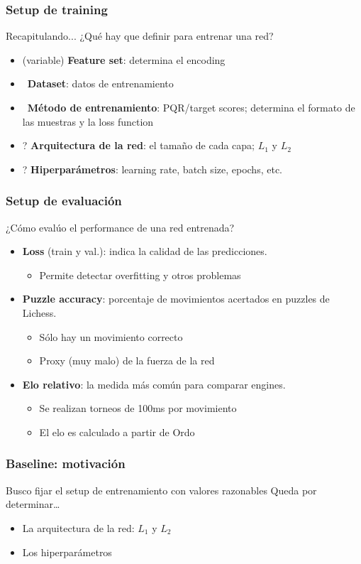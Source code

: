 
\begin{frame}
\frametitle{Setup de training}
Recapitulando... ¿Qué hay que definir para entrenar una red? \pause
\begin{itemize}
\item (variable) \textbf{Feature set}: determina el encoding \pause
\item \checkmark\ \textbf{Dataset}: datos de entrenamiento \pause
\item \checkmark\ \textbf{Método de entrenamiento}: PQR/target scores; determina el formato de las muestras y la loss function  \pause
\item ? \textbf{Arquitectura de la red}: el tamaño de cada capa; $L_1$ y $L_2$ \pause
\item ? \textbf{Hiperparámetros}: learning rate, batch size, epochs, etc.
\end{itemize}
\end{frame}

\begin{frame}
\frametitle{Setup de evaluación}
¿Cómo evalúo el performance de una red entrenada? \pause
\begin{itemize}
\item \textbf{Loss} (train y val.): indica la calidad de las predicciones.
\begin{itemize}
    \item Permite detectar overfitting y otros problemas \pause
\end{itemize}
\item \textbf{Puzzle accuracy}: porcentaje de movimientos acertados en puzzles de Lichess.
\begin{itemize}
    \item Sólo hay un movimiento correcto
    \item Proxy (muy malo) de la fuerza de la red \pause
\end{itemize}
\item \textbf{Elo relativo}: la medida más común para comparar engines.
\begin{itemize}
    \item Se realizan torneos de 100ms por movimiento
    \item El elo es calculado a partir de Ordo
\end{itemize}
\end{itemize}
\end{frame}

\begin{frame}
\frametitle{Baseline: motivación}
Busco fijar el setup de entrenamiento con valores razonables \pause
Queda por determinar\dots
\begin{itemize}
\item La arquitectura de la red: $L_1$ y $L_2$
\item Los hiperparámetros
\end{itemize}
\end{frame}

